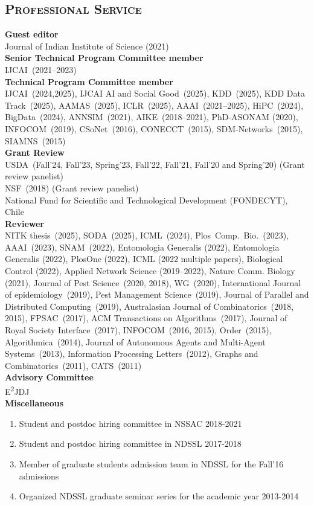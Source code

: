 \documentclass[margin,10pt]{res} %
\begin{document}
\begin{resume}
{\section{\textnormal{\textsc{Professional Service}}}
\noindent\textbf{Guest editor}\\
Journal of Indian Institute of Science (2021)
\smallskip\\
\noindent\textbf{Senior Technical Program Committee member}\\ 
IJCAI~(2021--2023)
\smallskip\\
\noindent\textbf{Technical Program Committee member}\\ 
IJCAI~(2024,2025), IJCAI AI and Social Good~(2025), KDD~(2025), KDD Data
Track~(2025), AAMAS~(2025), ICLR~(2025), AAAI~(2021--2025), HiPC~(2024),
BigData~(2024), ANNSIM~(2021), AIKE~(2018--2021), PhD-ASONAM (2020),
INFOCOM~(2019), CSoNet~(2016), CONECCT~(2015), SDM-Networks~(2015),
SIAMNS~(2015)\smallskip\\
\noindent\textbf{Grant Review}\\
USDA~(Fall'24, Fall'23, Spring'23, Fall'22, Fall'21, Fall'20 and Spring'20) (Grant review panelist)\\
NSF~(2018) (Grant review panelist)\\
National Fund for Scientific and Technological Development (FONDECYT),
Chile\smallskip\\
\noindent\textbf{Reviewer}\\ 
\noindent
NITK thesis~(2025),
SODA~(2025),
ICML~(2024),
Plos~Comp.~Bio.~(2023),
AAAI~(2023),
SNAM~(2022),
Entomologia Generalis (2022),
Entomologia Generalis (2022),
PlosOne (2022),
ICML (2022 multiple papers),
Biological Control (2022),
Applied Network Science (2019--2022),
Nature Comm. Biology (2021),
Journal of Pest Science~(2020, 2018), 
WG~(2020),
International Journal of epidemiology~(2019),
Pest Management Science~(2019), 
Journal of Parallel and Distributed Computing~(2019), 
Australasian Journal of Combinatorics~(2018, 2015),
FPSAC~(2017),
ACM Transactions on Algorithms~(2017),
Journal of Royal Society Interface~(2017), INFOCOM~(2016, 2015), Order~(2015), 
Algorithmica~(2014), Journal of Autonomous Agents and Multi-Agent
Systems~(2013), 
Information Processing Letters~(2012), 
Graphs and
Combinatorics~(2011), CATS~(2011)\smallskip\\
\noindent\textbf{Advisory Committee}\\
E\textsuperscript{2}JDJ\bigskip\\
\noindent\textbf{Miscellaneous}\\ 
\begin{enumerate}[$\circ$]
\item Student and postdoc hiring committee in NSSAC 2018-2021
\item Student and postdoc hiring committee in NDSSL 2017-2018
\item Member of graduate students admission team in NDSSL for the Fall'16
admissions
\item Organized NDSSL graduate seminar series for the academic year 2013-2014
\end{enumerate}
}
\end{resume}

\end{document}
